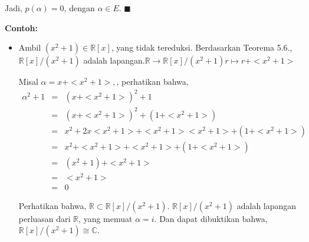 	Jadi, $p(\alpha )=0$, dengan $\alpha \in E.$ $\blacksquare$
\\
\par 	\textbf{Contoh:}
	\begin{itemize}
	\item Ambil $(x^2+1) \in \mathbb{R}[x]$, yang tidak tereduksi. Berdasarkan Teorema 5.6., $ \mathbb{R}[x]/(x^2+1)$ adalah lapangan.$\mathbb{R} \longrightarrow \mathbb{R}[x]/(x^2+1)  r \mapsto r+<x^2+1>$
\par 	Misal $\alpha = x +<x^2+1>,$, perhatikan bahwa,
	$$\begin{array}{rcl}
	\alpha^2+1 &=& (x +<x^2+1>)^2 + 1\\
	&=& (x +<x^2+1>)^2 + (1 +<x^2+1>)\\
	&=& x^2 +2x<x^2+1>+<x^2+1><x^2+1>+ (1 +<x^2+1>)\\
	&=& x^2 +<x^2+1>+<x^2+1>+ (1 +<x^2+1>)\\
	&=& (x^2+1) + <x^2+1>\\
	&=& <x^2+1>\\
	&=& 0
	\end{array}$$
\par 	Perhatikan bahwa, $\mathbb{R} \subset \mathbb{R}[x]/(x^2+1)$. $\mathbb{R}[x]/(x^2+1)$ adalah lapangan perluasan dari $\mathbb{R}$, yang memuat $\alpha = i$. Dan dapat dibuktikan bahwa, $\mathbb{R}[x]/(x^2+1) \cong \mathbb{C}.$
	\end{itemize}